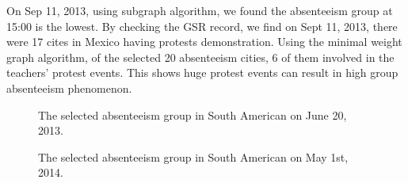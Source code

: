 On Sep 11, 2013, using subgraph algorithm, we found the absenteeism group at 15:00 is the lowest. By checking the GSR record, we find on Sept 11, 2013, there were 17 cites in Mexico having protests demonstration. Using the minimal weight graph algorithm, of the selected 20 absenteeism cities, 6 of them involved in the teachers' protest events. This shows huge protest events can result in high group absenteeism phenomenon.


\begin{figure}[t]
	\centering
	\vspace{-1em}
	\caption{ The selected absenteeism group in South American on June 20, 2013.}
	\label{fig:20130620}
\end{figure}

\begin{figure}[t]	
	\centering
	\vspace{-1em}
	\caption{ The selected absenteeism group in South American on May 1st, 2014.}
	\label{fig:labor_day}
\end{figure}


